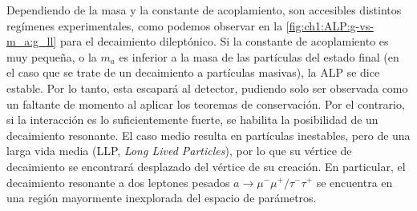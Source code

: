 Dependiendo de la masa y la constante de acoplamiento, son accesibles distintos regímenes experimentales, como podemos observar en la \cref{fig:ch1:ALP:g-vs-m_a:g_ll} para el decaimiento dileptónico. Si la constante de acoplamiento es muy pequeña, o la $m_a$ es inferior a la masa de las partículas del estado final (en el caso que se trate de un decaimiento a partículas masivas), la ALP se dice estable. Por lo tanto, esta escapará al detector, pudiendo solo ser observada como un faltante de momento al aplicar los teoremas de conservación. Por el contrario, si la interacción es lo suficientemente fuerte, se habilita la posibilidad de un decaimiento resonante. El caso medio resulta en partículas inestables, pero de una larga vida media (LLP, \textit{Long Lived Particles}), por lo que su vértice de decaimiento se encontrará desplazado del vértice de su creación. En particular, el decaimiento resonante a dos leptones pesados $a \to \mu^-\mu^+/\tau^-\tau^+$ se encuentra en una región mayormente inexplorada del espacio de parámetros.

